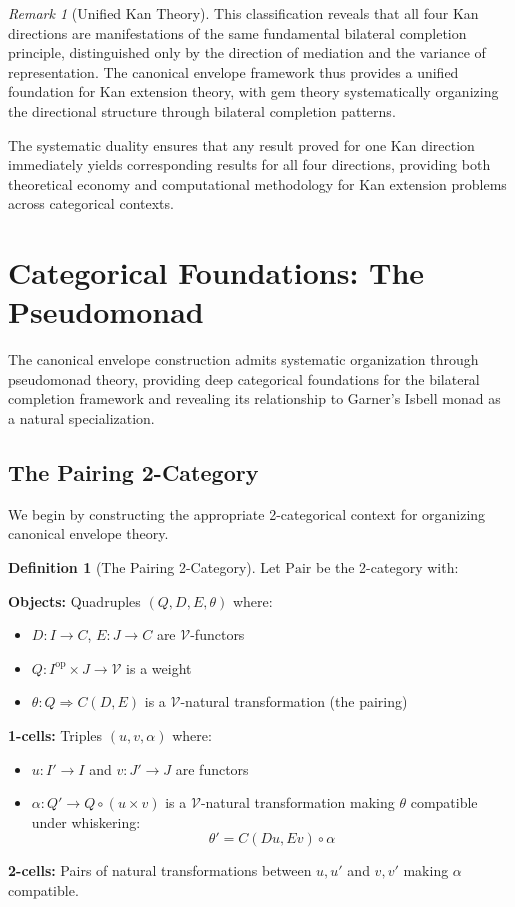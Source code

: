 \documentclass[11pt]{article}
\theoremstyle{plain}
\theoremstyle{definition}
\newtheorem{definition}[theorem]{Definition}
\theoremstyle{remark}
\newtheorem{remark}[theorem]{Remark}
\newcommand{\V}{\mathcal{V}}
\newcommand{\op}{\mathrm{op}}
\newcommand{\Pair}{\mathrm{Pair}}
\begin{document}
\begin{remark}[Unified Kan Theory]
\label{rem:unified-kan}
This classification reveals that all four Kan directions are manifestations of the same fundamental bilateral completion principle, distinguished only by the direction of mediation and the variance of representation. The canonical envelope framework thus provides a unified foundation for Kan extension theory, with gem theory systematically organizing the directional structure through bilateral completion patterns.

The systematic duality ensures that any result proved for one Kan direction immediately yields corresponding results for all four directions, providing both theoretical economy and computational methodology for Kan extension problems across categorical contexts.
\end{remark}

\section{Categorical Foundations: The Pseudomonad}

The canonical envelope construction admits systematic organization through pseudomonad theory, providing deep categorical foundations for the bilateral completion framework and revealing its relationship to Garner's Isbell monad \cite{garner2018isbell} as a natural specialization.

\subsection{The Pairing 2-Category}

We begin by constructing the appropriate 2-categorical context for organizing canonical envelope theory.

\begin{definition}[The Pairing 2-Category]
Let $\Pair$ be the 2-category with:

\textbf{Objects:} Quadruples $(Q, D, E, \theta)$ where:
\begin{itemize}
\item $D : I \to C$, $E : J \to C$ are $\V$-functors
\item $Q : I^{\op} \times J \to \V$ is a weight  
\item $\theta : Q \Rightarrow C(D, E)$ is a $\V$-natural transformation (the pairing)
\end{itemize}

\textbf{1-cells:} Triples $(u, v, \alpha)$ where:
\begin{itemize}
\item $u : I' \to I$ and $v : J' \to J$ are functors
\item $\alpha : Q' \to Q \circ (u \times v)$ is a $\V$-natural transformation making $\theta$ compatible under whiskering:
$$
\theta' = C(Du, Ev) \circ \alpha
$$
\end{itemize}

\textbf{2-cells:} Pairs of natural transformations between $u, u'$ and $v, v'$ making $\alpha$ compatible.
\end{definition}
\end{document}
